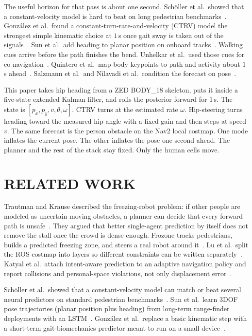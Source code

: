 \documentclass[letterpaper, 10pt, conference]{IEEEtran}
\begin{document}
The useful horizon for that pass is about one second. Sch\"oller et al.\
showed that a constant-velocity model is hard to beat on long pedestrian
benchmarks~\cite{schoeller2020constant}. Gonz\'alez et al.\ found a
constant-turn-rate-and-velocity (CTRV) model the strongest simple kinematic
choice at $1$\,s once gait sway is taken out of the
signals~\cite{gonzalez2022gait}. Sun et al.\ add heading to planar position
on onboard tracks~\cite{sun2018threedof}. Walking cues arrive before the
path finishes the bend. Unhelkar et al.\ used those cues for
co-navigation~\cite{unhelkar2015anticipatory}. Quintero et al.\ map body
keypoints to path and activity about $1$\,s ahead~\cite{quintero2018path}.
Salzmann et al.\ and Nilavadi et al.\ condition the forecast on
pose~\cite{salzmann2023robots,uptor2025}.

This paper takes hip heading from a ZED BODY\_18 skeleton, puts it inside a
five-state extended Kalman filter, and rolls the posterior forward for
$1$\,s. The state is $[p_x,p_y,v,\theta,\omega]$. CTRV turns at the
estimated rate $\omega$. Hip-steering turns heading toward the measured hip
angle with a fixed gain and then steps at speed $v$. The same forecast is
the person obstacle on the Nav2 local costmap. One mode inflates the
current pose. The other inflates the pose one second ahead. The planner
and the rest of the stack stay fixed. Only the human cells move.

\section{RELATED WORK}

Trautman and Krause described the freezing-robot problem: if other people
are modeled as uncertain moving obstacles, a planner can decide that every
forward path is unsafe~\cite{trautman2010unfreezing}. They argued that
better single-agent prediction by itself does not remove the stall once
the crowd is dense enough. Frozone tracks pedestrians, builds a predicted
freezing zone, and steers a real robot around it~\cite{sathyamoorthy2020frozone}.
Lu et al.\ split the ROS costmap into layers so different constraints can
be written separately~\cite{lu2014layered}. Katyal et al.\ attach
intent-aware prediction to an adaptive navigation policy and report
collisions and personal-space violations, not only displacement
error~\cite{katyal2020intent}.

Sch\"oller et al.\ showed that a constant-velocity model can match or beat
several neural predictors on standard pedestrian
benchmarks~\cite{schoeller2020constant}. Sun et al.\ learn 3DOF pose
trajectories (planar position plus heading) from long-term range-finder
deployments with an LSTM~\cite{sun2018threedof}. Gonz\'alez et al.\ replace
a basic kinematic step with a short-term gait-biomechanics predictor meant
to run on a small device~\cite{gonzalez2022gait}.
\end{document}
